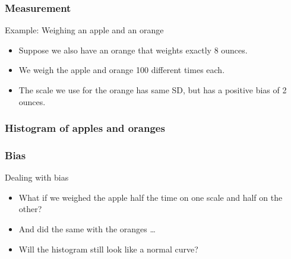 \documentclass[handout]{beamer}
\begin{document}

   \begin{frame} \frametitle{Measurement}

   \begin{block}
   {Example: Weighing an apple and an orange}
   \begin{itemize}
   \item Suppose we also have an orange that weights exactly 8 ounces.
   \item We weigh the apple and orange 100 different times each.
   \item The scale we use for the orange has same SD, but has a positive
   bias of 2 ounces.
   \end{itemize}
   \end{block}
   \end{frame}



   \begin{frame}
   \frametitle{Histogram of apples and oranges}
   \begin{center}
   \end{center}

   \end{frame}


   \begin{frame} \frametitle{Bias}

   \begin{block}
   {Dealing with bias}
   \begin{itemize}
   \item What if we weighed the apple half the time on one scale
   and half on the other?

   \item And did the same with the oranges \dots

   \item Will the histogram still look like a normal curve?

   \end{itemize}
   \end{block}
   \end{frame}
\end{document}
